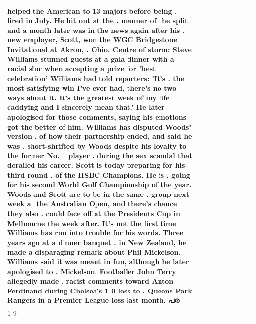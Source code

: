 \begin{table}[H]
\begin{tabular}{lllrlllll}
helped the American to 13 majors before being . fired in July. He hit out at the . manner of the split and a month later was in the news again after his . new employer, Scott, won the WGC Bridgestone Invitational at Akron, . Ohio. Centre of storm: Steve Williams stunned guests at a gala dinner with a racial slur when accepting a prize for 'best celebration' Williams had told reporters: 'It's . the most satisfying win I've ever had, there's no two ways about it. It's the greatest week of my life caddying and I sincerely mean that.' He later apologised for those comments, saying his emotions got the better of him. Williams has disputed Woods' version . of how their partnership ended, and said he was . short-shrifted by Woods despite his loyalty to the former No. 1 player . during the sex scandal that derailed his career. Scott is today preparing for his third round . of the HSBC Champions. He is . going for his second World Golf Championship of the year. Woods and Scott are to be in the same . group next week at the Australian Open, and there's chance they also . could face off at the Presidents Cup in Melbourne the week after. It's not the first time Williams has run into trouble for his words. Three years ago at a dinner banquet . in New Zealand, he made a disparaging remark about Phil Mickelson. Williams said it was meant in fun, although he later apologised to . Mickelson. Footballer John Terry allegedly made . racist comments toward Anton Ferdinand during Chelsea's 1-0 loss to . Queens Park Rangers in a Premier League loss last month. പര \\
\cline{1-9}

\end{tabular}
\end{table}
